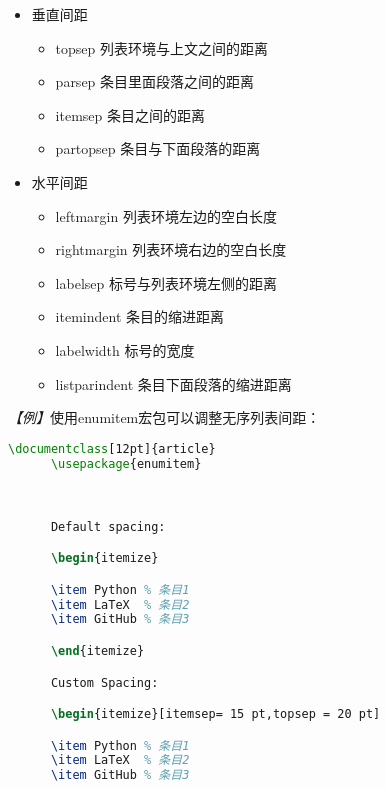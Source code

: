 {\begin{itemize}
      \item 垂直间距
            \begin{itemize}
                  \item topsep 列表环境与上文之间的距离
                  \item parsep 条目里面段落之间的距离
                  \item itemsep 条目之间的距离
                  \item partopsep 条目与下面段落的距离
            \end{itemize}
      \item 水平间距
            \begin{itemize}
                  \item leftmargin 列表环境左边的空白长度
                  \item rightmargin 列表环境右边的空白长度
                  \item labelsep 标号与列表环境左侧的距离
                  \item itemindent 条目的缩进距离
                  \item labelwidth 标号的宽度
                  \item listparindent 条目下面段落的缩进距离
            \end{itemize}
\end{itemize}

\emph{【例】}使用enumitem宏包可以调整无序列表间距：
\begin{lstlisting}[language=TeX]
      \documentclass[12pt]{article}
      \usepackage{enumitem}
      


      Default spacing:

      \begin{itemize}

      \item Python % 条目1
      \item LaTeX  % 条目2
      \item GitHub % 条目3

      \end{itemize}

      Custom Spacing:

      \begin{itemize}[itemsep= 15 pt,topsep = 20 pt]

      \item Python % 条目1
      \item LaTeX  % 条目2
      \item GitHub % 条目3


\end{lstlisting}}
